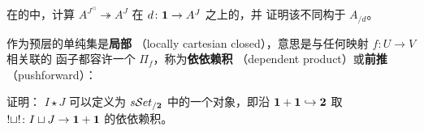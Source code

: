 \begin{exercise}\label{ex:fiber-of-cone-category}
在\trQuasiCategory{}的\trInfinityCosmos{}中，计算 $A^{J^{\triangleleft}}\twoheadrightarrow A^{J}$ 在 $d\colon\mathbf{1}\to A^{J}$ 之上的\trFiber，并
证明该\trQuasiCategory{}不同构于 $A_{/d}$。
\end{exercise}

\begin{exercise}\label{ex:join-dependent-product}
作为预层\trCategory{}的单纯集\trCategory{}是\textbf{局部\trCartesianClosed}%
（locally cartesian closed），意思是与任何映射 $f\colon U\to V$ 相关联的%
\trPullback{}函子都容许一个\trRightAdjoint{} $\Pi_{f}$，称为\textbf{依依赖积}%
（dependent product）或\textbf{前推}（pushforward）：
\begin{center}
\end{center}
证明：\trJoin{} $I\star J$ 可以定义为 $s\mathcal{S}et_{/\mathbf{2}}$ 中的一个对象，即沿
$\mathbf{1}+\mathbf{1}\hookrightarrow\mathbf{2}$ 取 $!\sqcup!\colon I\sqcup J\to\mathbf{1}+\mathbf{1}$ 的依依赖积。
\end{exercise}

